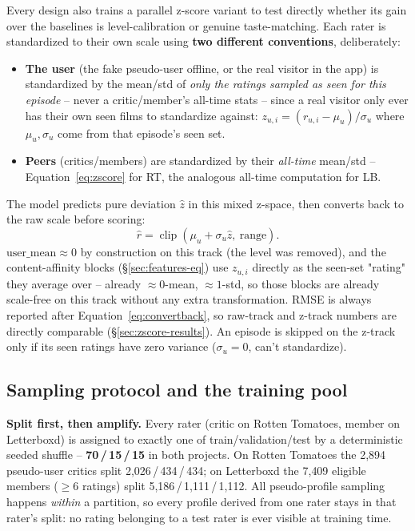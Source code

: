 \documentclass[11pt]{article}
\begin{document}
Every design also trains a parallel z-score variant to test directly whether its gain over the baselines is level-calibration or genuine taste-matching. Each rater is standardized to their own scale using \textbf{two different conventions}, deliberately:
\begin{itemize}
\item \textbf{The user} (the fake pseudo-user offline, or the real visitor in the app) is standardized by the mean/std of \emph{only the ratings sampled as seen for this episode} -- never a critic/member's all-time stats -- since a real visitor only ever has their own seen films to standardize against: $z_{u,i}=(r_{u,i}-\mu_u)/\sigma_u$ where $\mu_u,\sigma_u$ come from that episode's seen set.
\item \textbf{Peers} (critics/members) are standardized by their \emph{all-time} mean/std -- Equation~\ref{eq:zscore} for RT, the analogous all-time computation for LB.
\end{itemize}
The model predicts pure deviation $\hat z$ in this mixed z-space, then converts back to the raw scale before scoring:
\begin{equation}
\hat r = \operatorname{clip}\!\left(\mu_u + \sigma_u\hat z,\ \text{range}\right).
\label{eq:convertback}
\end{equation}
$\mathrm{user\_mean}\approx0$ by construction on this track (the level was removed), and the content-affinity blocks (\S\ref{sec:features-eq}) use $z_{u,i}$ directly as the seen-set "rating" they average over -- already $\approx0$-mean, $\approx1$-std, so those blocks are already scale-free on this track without any extra transformation. RMSE is always reported after Equation~\ref{eq:convertback}, so raw-track and z-track numbers are directly comparable (\S\ref{sec:zscore-results}). An episode is skipped on the z-track only if its seen ratings have zero variance ($\sigma_u=0$, can't standardize).

\subsection{Sampling protocol and the training pool}
\label{sec:protocol}

\textbf{Split first, then amplify.} Every rater (critic on Rotten Tomatoes, member on Letterboxd) is assigned to exactly one of train/validation/test by a deterministic seeded shuffle -- \textbf{70\,/\,15\,/\,15} in both projects. On Rotten Tomatoes the 2{,}894 pseudo-user critics split 2{,}026\,/\,434\,/\,434; on Letterboxd the 7{,}409 eligible members ($\geq$6 ratings) split 5{,}186\,/\,1{,}111\,/\,1{,}112. All pseudo-profile sampling happens \emph{within} a partition, so every profile derived from one rater stays in that rater's split: no rating belonging to a test rater is ever visible at training time.
\end{document}
